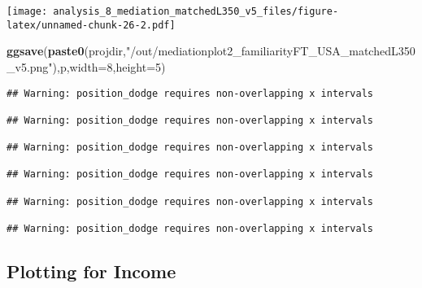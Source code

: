 \documentclass[
]{article}
\newenvironment{Shaded}{\begin{snugshade}}{\end{snugshade}}
\newcommand{\DataTypeTok}[1]{\textcolor[rgb]{0.13,0.29,0.53}{#1}}
\newcommand{\DecValTok}[1]{\textcolor[rgb]{0.00,0.00,0.81}{#1}}
\newcommand{\KeywordTok}[1]{\textcolor[rgb]{0.13,0.29,0.53}{\textbf{#1}}}
\newcommand{\NormalTok}[1]{#1}
\newcommand{\StringTok}[1]{\textcolor[rgb]{0.31,0.60,0.02}{#1}}
\begin{document}
\texttt{[image: analysis\_8\_mediation\_matchedL350\_v5\_files/figure-latex/unnamed-chunk-26-2.pdf]}

\begin{Shaded}
\begin{Highlighting}[]
\KeywordTok{ggsave}\NormalTok{(}\KeywordTok{paste0}\NormalTok{(projdir,}\StringTok{"/out/mediationplot2_familiarityFT_USA_matchedL350_v5.png"}\NormalTok{),p,}\DataTypeTok{width=}\DecValTok{8}\NormalTok{,}\DataTypeTok{height=}\DecValTok{5}\NormalTok{)}
\end{Highlighting}
\end{Shaded}

\begin{verbatim}
## Warning: position_dodge requires non-overlapping x intervals

## Warning: position_dodge requires non-overlapping x intervals

## Warning: position_dodge requires non-overlapping x intervals

## Warning: position_dodge requires non-overlapping x intervals

## Warning: position_dodge requires non-overlapping x intervals

## Warning: position_dodge requires non-overlapping x intervals
\end{verbatim}

\hypertarget{plotting-for-income}{%
\subsection{Plotting for Income}\label{plotting-for-income}}
\end{document}
